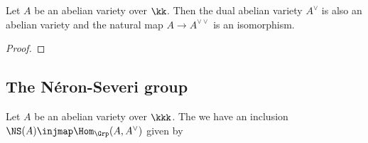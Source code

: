     \begin{proposition}\label{prop:dual_of_dual_is_A}
        Let \(A\) be an abelian variety over \(\kk\).
        Then the dual abelian variety \(A^\vee\) is also an abelian variety and the natural map \(A \to A^{\vee\vee}\) is an isomorphism.
    \end{proposition}
    \begin{proof}
    \end{proof}


\subsection{The N\'eron-Severi group}


    \begin{theorem}\label{thm:NS_A_as_homomorphisms_from_A_to_A_dual}
        Let \(A\) be an abelian variety over \(\kkk\).
        The we have an inclusion \(\NS(A) \injmap \Hom_{\Grp}(A, A^\vee)\) given by 
    \end{theorem}